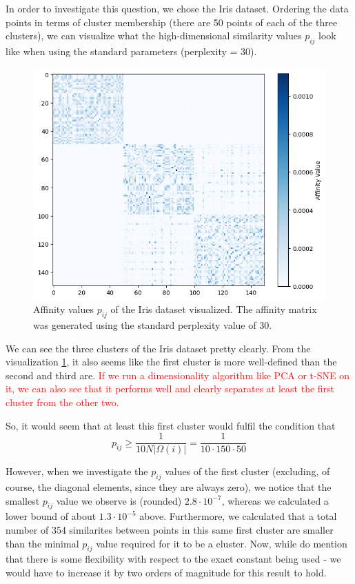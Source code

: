 In order to investigate this question, we chose the Iris dataset. 
Ordering the data points in terms of cluster membership (there are 50 points of each of the three clusters), we can visualize what the high-dimensional similarity values $p_{ij}$ look like when using the standard parameters (perplexity = 30). 

\begin{figure}[h]
    \centering 
        \includegraphics[width=0.7\linewidth]{figures/iris_affinity_matrix.png}
        \caption{Affinity values $p_{ij}$ of the Iris dataset visualized. The affinity matrix was generated using the standard perplexity value of 30.}
    \label{fig:iris_affinities}
\end{figure}

We can see the three clusters of the Iris dataset pretty clearly. 
From the visualization \ref{fig:iris_affinities}, it also seems like the first cluster is more well-defined than the second and third are. 
\textcolor{red}{If we run a dimensionality algorithm like PCA or t-SNE on it, we can also see that it performs well and clearly separates at least the first cluster from the other two.} 

So, it would seem that at least this first cluster would fulfil the condition that \begin{equation} p_{ij} \geq \frac{1}{10 N |\Omega(i)|} = \frac{1}{10 \cdot 150 \cdot 50} \end{equation}

However, when we investigate the $p_{ij}$ values of the first cluster (excluding, of course, the diagonal elements, since they are always zero), we notice that the smallest $p_{ij}$ value we observe is (rounded) $2.8 \cdot 10^{-7}$, whereas we calculated a lower bound of about $1.3 \cdot 10^{-5}$ above.
Furthermore, we calculated that a total number of 354 similarites between points in this same first cluster are smaller than the minimal $p_{ij}$ value required for it to be a cluster. 
Now, while \cite{LinStei22} do mention that there is some flexibility with respect to the exact constant being used - we would have to increase it by two orders of magnitude for this result to hold. 

